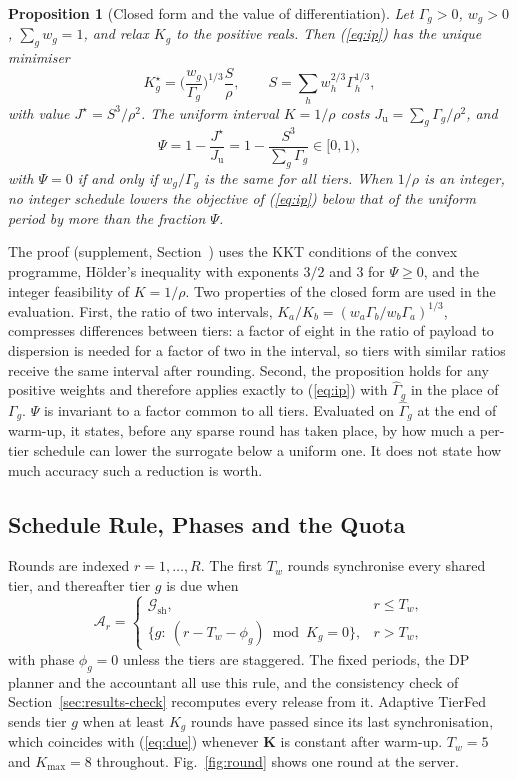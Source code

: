 \documentclass[journal]{IEEEtran}
\newtheorem{proposition}{Proposition}
\newcommand{\tierfed}{TierFed}
\newcommand{\Gh}{\hat\Gamma}
\begin{document}
\begin{proposition}[Closed form and the value of differentiation]
\label{prop:cuberoot}
Let $\Gamma_g>0$, $w_g>0$, $\sum_gw_g=1$, and relax $K_g$ to the positive reals. Then (\ref{eq:ip}) has the unique minimiser
\begin{equation}
K_g^\star=\Big(\frac{w_g}{\Gamma_g}\Big)^{1/3}\frac{S}{\rho},\qquad S=\sum_hw_h^{2/3}\Gamma_h^{1/3},
\label{eq:cuberoot}
\end{equation}
with value $J^\star=S^3/\rho^2$. The uniform interval $K=1/\rho$ costs $J_{\mathrm u}=\sum_g\Gamma_g/\rho^2$, and
\begin{equation}
\Psi=1-\frac{J^\star}{J_{\mathrm u}}=1-\frac{S^3}{\sum_g\Gamma_g}\in[0,1),
\label{eq:psi}
\end{equation}
with $\Psi=0$ if and only if $w_g/\Gamma_g$ is the same for all tiers. When $1/\rho$ is an integer, no integer schedule lowers the objective of (\ref{eq:ip}) below that of the uniform period by more than the fraction $\Psi$.
\end{proposition}
The proof (supplement, Section~) uses the KKT conditions of the convex programme, H\"older's inequality with exponents $3/2$ and $3$ for $\Psi\ge0$, and the integer feasibility of $K=1/\rho$. Two properties of the closed form are used in the evaluation. First, the ratio of two intervals, $K_a/K_b=(w_a\Gamma_b/w_b\Gamma_a)^{1/3}$, compresses differences between tiers: a factor of eight in the ratio of payload to dispersion is needed for a factor of two in the interval, so tiers with similar ratios receive the same interval after rounding. Second, the proposition holds for any positive weights and therefore applies exactly to (\ref{eq:ip}) with $\Gh_g$ in the place of $\Gamma_g$. $\Psi$ is invariant to a factor common to all tiers. Evaluated on $\Gh_g$ at the end of warm-up, it states, before any sparse round has taken place, by how much a per-tier schedule can lower the surrogate below a uniform one. It does not state how much accuracy such a reduction is worth.

\subsection{Schedule Rule, Phases and the Quota}
Rounds are indexed $r=1,\dots,R$. The first $T_w$ rounds synchronise every shared tier, and thereafter tier $g$ is due when
\begin{equation}
\mathcal A_r=\begin{cases}\mathcal G_{\mathrm{sh}}, & r\le T_w,\\ \{g:\ (r-T_w-\phi_g)\bmod K_g=0\}, & r>T_w,\end{cases}
\label{eq:due}
\end{equation}
with phase $\phi_g=0$ unless the tiers are staggered. The fixed periods, the DP planner and the accountant all use this rule, and the consistency check of Section~\ref{sec:results-check} recomputes every release from it. Adaptive \tierfed{} sends tier $g$ when at least $K_g$ rounds have passed since its last synchronisation, which coincides with (\ref{eq:due}) whenever $\mathbf K$ is constant after warm-up. $T_w=5$ and $K_{\max}=8$ throughout. Fig.~\ref{fig:round} shows one round at the server.
\end{document}
